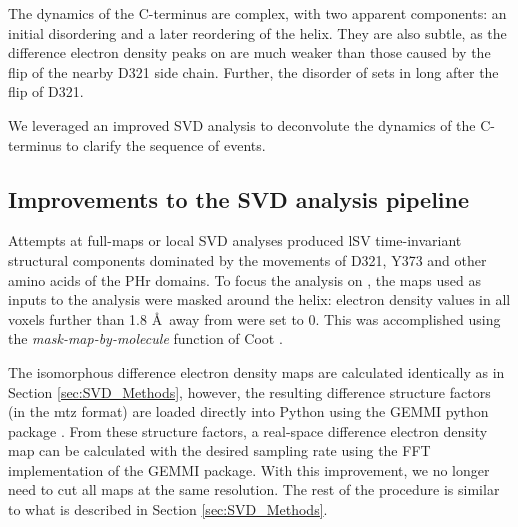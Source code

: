 The dynamics of the C-terminus are complex, with two apparent components: an initial disordering and a later reordering of the  helix. They are also subtle, as the difference electron density peaks on  are much weaker than those caused by the flip of the nearby D321 side chain. Further, the disorder of  sets in long after the flip of D321. 
\vspace{2mm}

We leveraged an improved SVD analysis to deconvolute the dynamics of the C-terminus to clarify the sequence of events. 

\subsection{Improvements to the SVD analysis pipeline}

Attempts at full-maps or local SVD analyses produced lSV time-invariant structural components dominated by the movements of D321, Y373 and other amino acids of the PHr domains. To focus the analysis on , the maps used as inputs to the analysis were masked around the helix: electron density values in all voxels further than 1.8 \AA\ away from  were set to 0. This was accomplished using the \textit{mask-map-by-molecule} function of Coot \parencite{emsleyFeaturesDevelopmentCoot2010}.

The isomorphous difference electron density maps are calculated identically as in Section \ref{sec:SVD_Methods}, however, the resulting difference structure factors (in the mtz format) are loaded directly into Python using the GEMMI python package \parencite{yamashitaGEMMIServalcatRestrain2023}. From these structure factors, a real-space difference electron density map can be calculated with the desired sampling rate using the FFT implementation of the GEMMI package. With this improvement, we no longer need to cut all maps at the same resolution. The rest of the procedure is similar to what is described in Section \ref{sec:SVD_Methods}.

